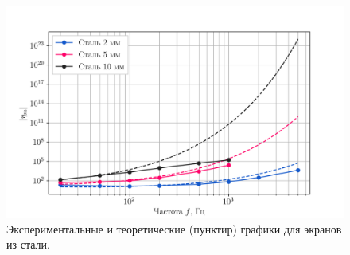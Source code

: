 \begin{figure}[H]
	\vspace{-20pt}
	\centering
	\includegraphics[width=0.95\linewidth]{imgs/graphs/steel.png}
	\caption{Экспериментальные и теоретические (пунктир) графики для экранов из стали.}
	\label{fig:eta_wt_steel}
\end{figure}


